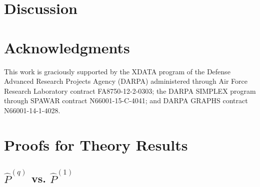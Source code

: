 \documentclass[a4paper]{article}
\renewcommand{\hat}{\widehat}
\begin{document}
\section{Discussion}



\section*{Acknowledgments}
This work is graciously supported by the XDATA program of the Defense
Advanced Research Projects Agency (DARPA) administered through Air
Force Research Laboratory contract FA8750-12-2-0303; the DARPA SIMPLEX
program through SPAWAR contract N66001-15-C-4041; and DARPA GRAPHS
contract N66001-14-1-4028.


{}




\appendix


\section{Proofs for Theory Results}

\subsection{$\hat{P}^{(q)}$ vs. $\hat{P}^{(1)}$}
\end{document}
